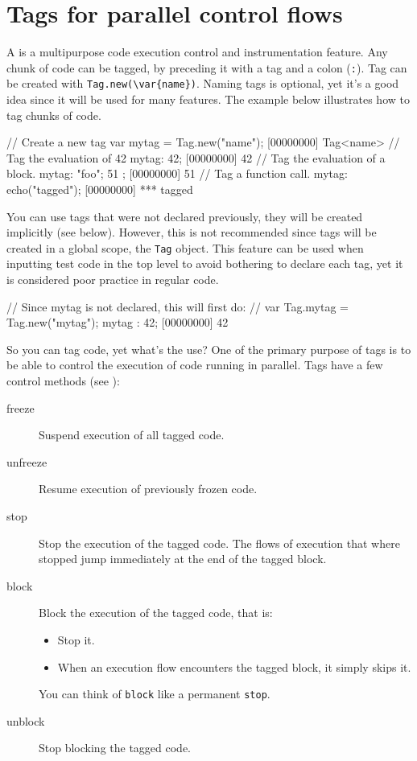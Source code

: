 \section{Tags for parallel control flows}
\label{sec:tut:tags}

A  is a multipurpose code execution control and instrumentation
feature. Any chunk of code can be tagged, by preceding it with a tag
and a colon (\lstinline{:}). Tag can be created with
\lstinline|Tag.new(\var{name})|.  Naming tags is optional, yet it's
a good idea since it will be used for many features. The example below
illustrates how to tag chunks of code.

\begin{urbiscript}[firstnumber=1]
// Create a new tag
var mytag = Tag.new("name");
[00000000] Tag<name>
// Tag the evaluation of 42
mytag: 42;
[00000000] 42
// Tag the evaluation of a block.
mytag: { "foo"; 51 };
[00000000] 51
// Tag a function call.
mytag: echo("tagged");
[00000000] *** tagged
\end{urbiscript}

You can use tags that were not declared previously, they will be created
implicitly (see below). However, this is not recommended since
tags will be created in a global scope, the \lstinline{Tag} object. This
feature can be used when inputting test code in the top level to avoid
bothering to declare each tag, yet it is considered poor
practice in regular code.

\begin{urbiscript}[firstnumber=1]
// Since mytag is not declared, this will first do:
// var Tag.mytag = Tag.new("mytag");
mytag : 42;
[00000000] 42
\end{urbiscript}

So you can tag code, yet what's the use? One of the primary purpose of
tags is to be able to control the execution of code running in
parallel. Tags have a few control methods (see ):

\begin{description}
\item[freeze] Suspend execution of all tagged code.
\item[unfreeze] Resume execution of previously frozen code.
\item[stop] Stop the execution of the tagged code. The flows of
  execution that where stopped jump immediately at the end of the
  tagged block.
\item[block] Block the execution of the tagged code, that is:
  \begin{itemize}
  \item Stop it.
  \item When an execution flow encounters the tagged block, it simply
    skips it.
  \end{itemize}
  You can think of \lstinline{block} like a permanent \lstinline{stop}.
\item[unblock] Stop blocking the tagged code.
\end{description}

